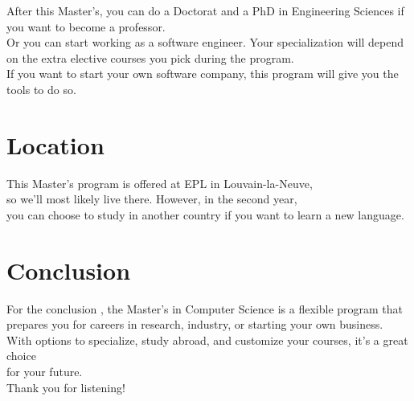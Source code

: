 \documentclass{article}
\begin{document}
After this Master’s, you can do a Doctorat and a PhD in Engineering Sciences 
if you want to become a professor.  \\

Or you can start working as a software engineer. Your specialization will 
depend on the extra elective courses you pick during the program. \\ 

If you want to start your own software company, this program will give you the tools to do so.\\

\section{Location}

This Master’s program is offered at EPL in Louvain-la-Neuve, \\
so we’ll most likely live there. However, in the second year, \\
you can choose to study in another country if you want to learn a new language.

\section{Conclusion}

For the conclusion , the Master’s in Computer Science is a flexible program that \\
prepares you for careers in research, industry, or starting your own business. \\
With options to specialize, study abroad, and customize your courses, it’s a great choice \\
for your future.  \\

Thank you for listening!
\end{document}
